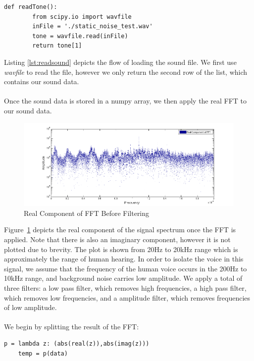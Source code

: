 \begin{lstlisting}[caption={Sound File Reading},label=lst:readsound,firstnumber=6]
    def readTone():
        from scipy.io import wavfile
        inFile = './static_noise_test.wav'
        tone = wavfile.read(inFile)
        return tone[1]
\end{lstlisting}
Listing \ref{lst:readsound} depicts the flow of loading the sound file. We first use \emph{wavfile} to read the file, however we only return the second row of the list, which contains our sound data.
\\\\
Once the sound data is stored in a numpy array, we then apply the real FFT to our sound data.
\begin{figure}[H]
    \centering
        \includegraphics[width=6.5in]{./include/beforefig.png}
    \caption{Real Component of FFT Before Filtering}
    \label{fig:beforeFilt}
\end{figure}\noindent
Figure~\ref{fig:beforeFilt} depicts the real component of the signal spectrum once the FFT is applied. Note that there is also an imaginary component, however it is not plotted due to brevity. The plot is shown from 20Hz to 20kHz range which is approximately the range of human hearing. In order to isolate the voice in this signal, we assume that the frequency of the human voice occurs in the 200Hz to 10kHz range, and background noise carries low amplitude. We apply a total of three filters: a low pass filter, which removes high frequencies, a high pass filter, which removes low frequencies, and a amplitude filter, which removes frequencies of low amplitude.
\\\\
We begin by splitting the result of the FFT:
\begin{lstlisting}[caption={Splitting Spectrum into Real and Imaginary Components},label=lst:split,firstnumber=18]
    p = lambda z: (abs(real(z)),abs(imag(z)))
    temp = p(data)
\end{lstlisting}
